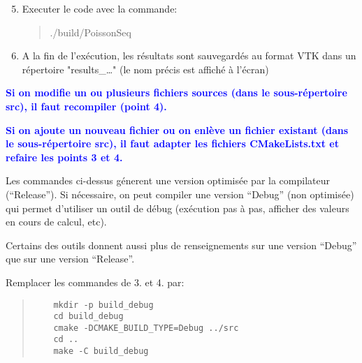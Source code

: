 \documentclass{beamer}
\begin{document}
\begin{frame}
	\begin{enumerate}
  		\setcounter{enumi}{4}
		\item Executer le code avec la commande:
		\begin{quote}
			./build/PoissonSeq
		\end{quote}
		\item A la fin de l'exécution, les résultats sont sauvegardés au format VTK dans un répertoire "results\_\ldots" (le nom précis est affiché à l'écran)
	\end{enumerate}

\vfill
\textcolor{blue}{\bf Si on modifie un ou plusieurs fichiers sources (dans le sous-r\'epertoire src), il faut recompiler (point 4).}
\vfill

\textcolor{blue}{\bf Si on ajoute un nouveau fichier ou on enl\`eve un fichier existant (dans le sous-r\'epertoire src), il faut adapter les fichiers CMakeLists.txt et refaire les points 3 et 4.}
\vfill

\end{frame}

\begin{frame}[fragile]
\vfill
Les commandes ci-dessus g\'enerent une version optimis\'ee par la compilateur (``Release''). Si n\'ecessaire, on peut compiler une version ``Debug'' (non optimis\'ee)
qui permet d'utiliser un outil de d\'ebug (ex\'ecution pas \`a pas, afficher des valeurs en cours de calcul, etc).
\vfill

Certains des outils donnent aussi plus de renseignements sur une version ``Debug'' que sur une version ``Release''.
\vfill

Remplacer les commandes de 3. et 4. par:
	\begin{quote}
	\begin{verbatim}
	mkdir -p build_debug
	cd build_debug
	cmake -DCMAKE_BUILD_TYPE=Debug ../src
	cd ..
	make -C build_debug
	\end{verbatim}
\end{quote}
\vfill

\end{frame}
\end{document}
